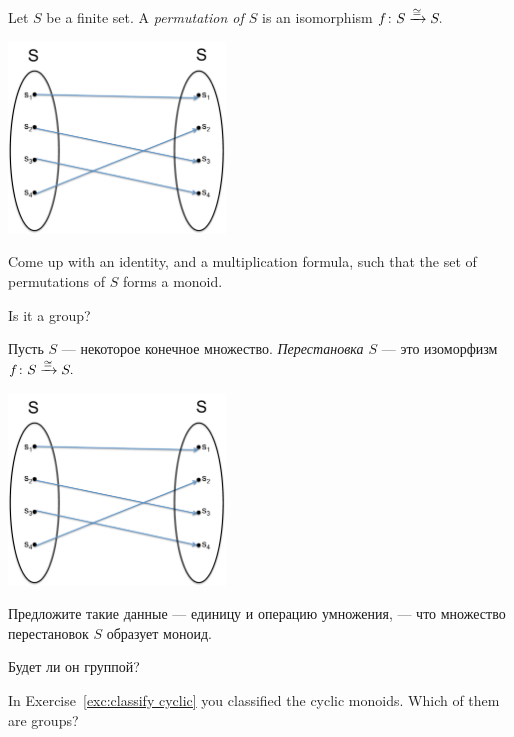 \documentclass[../main/CT4S-EN-RU]{subfiles}
\begin{document}
\begin{exerciseENG}\label{exc:permutation}
Let $S$ be a finite set. A {\em permutation of $S$} is an isomorphism $f\colon S\xrightarrow{\cong}S.$ 
\begin{center}
\parbox{2.3in}{
\includegraphics[height=2in]{SetPermutation}}
\end{center}
\sexc Come up with an identity, and a  multiplication formula, such that the set of permutations of $S$ forms a monoid. 
\item Is it a group?
\endsexc
\end{exerciseENG}

\begin{exerciseRUS}\label{exc:permutation}
Пусть $S$ — некоторое конечное множество. {\em Перестановка $S$} — это изоморфизм $f\colon S\xrightarrow{\cong}S.$ 
\begin{center}
\parbox{2.3in}{
\includegraphics[height=2in]{SetPermutation}}
\end{center}
\sexc Предложите такие данные — единицу и операцию умножения, — что множество перестановок $S$ образует моноид. 
\item Будет ли он группой?
\endsexc
\end{exerciseRUS}

\begin{exerciseENG}
In Exercise~\ref{exc:classify cyclic} you classified the cyclic monoids. Which of them are groups? 
\end{exerciseENG}
\end{document}

